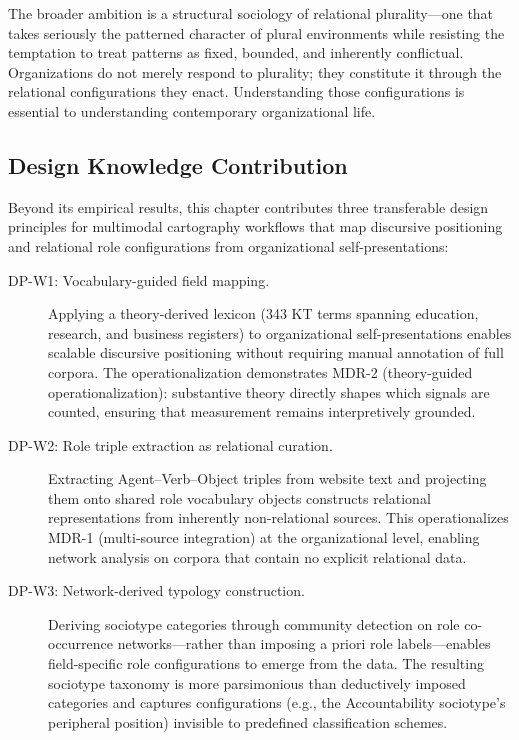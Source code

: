 \documentclass[../main.tex]{subfiles}
\begin{document}
The broader ambition is a structural sociology of relational plurality---one that takes seriously the patterned character of plural environments while resisting the temptation to treat patterns as fixed, bounded, and inherently conflictual. Organizations do not merely respond to plurality; they constitute it through the relational configurations they enact. Understanding those configurations is essential to understanding contemporary organizational life.

\subsection{Design Knowledge Contribution}

Beyond its empirical results, this chapter contributes three transferable design principles for multimodal cartography workflows that map discursive positioning and relational role configurations from organizational self-presentations:

\begin{description}
    \item[DP-W1: Vocabulary-guided field mapping.] Applying a theory-derived lexicon (343 KT terms spanning education, research, and business registers) to organizational self-presentations enables scalable discursive positioning without requiring manual annotation of full corpora. The operationalization demonstrates MDR-2 (theory-guided operationalization): substantive theory directly shapes which signals are counted, ensuring that measurement remains interpretively grounded.

    \item[DP-W2: Role triple extraction as relational curation.] Extracting Agent--Verb--Object triples from website text and projecting them onto shared role vocabulary objects constructs relational representations from inherently non-relational sources. This operationalizes MDR-1 (multi-source integration) at the organizational level, enabling network analysis on corpora that contain no explicit relational data.

    \item[DP-W3: Network-derived typology construction.] Deriving sociotype categories through community detection on role co-occurrence networks---rather than imposing a priori role labels---enables field-specific role configurations to emerge from the data. The resulting sociotype taxonomy is more parsimonious than deductively imposed categories and captures configurations (e.g., the Accountability sociotype's peripheral position) invisible to predefined classification schemes.
\end{description}
\end{document}
